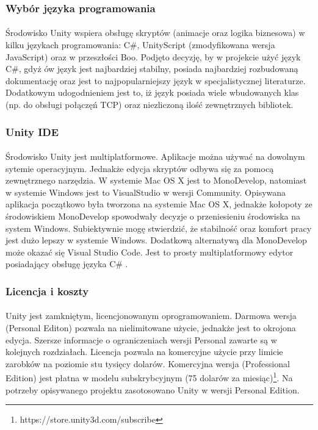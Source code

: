 \documentclass[12pt]{article}
\begin{document}
{{\subsubsection{Wybór języka programowania}
\paragraph{}
Środowisko Unity wspiera obsługę skryptów (animacje oraz logika biznesowa) w kilku językach programowania: C\#, UnityScript (zmodyfikowana wersja JavaScript)  oraz w przeszłości Boo. Podjęto decyzję, by w projekcie użyć język C\#, gdyż ów język jest najbardziej stabilny, posiada najbardziej rozbudowaną dokumentację oraz jest to najpopularniejszy język w specjalistycznej literaturze. Dodatkowym udogodnieniem  jest to, iż  język posiada wiele wbudowanych klas (np. do obsługi połączęń TCP) oraz niezliczoną ilość zewnętrznych bibliotek.
\subsubsection{Unity IDE}
\paragraph{}
Środowisko Unity jest multiplatformowe. Aplikacje można używać na dowolnym sytemie operacyjnym. Jednakże edycja skryptów odbywa się za pomocą zewnętrznego narzędzia. W systemie Mac OS X jest to MonoDevelop, natomiast w systemie Windows jest to VisualStudio w wersji Community. Opisywana aplikacja początkowo była tworzona na systemie Mac OS X, jednakże kołopoty ze środowiskiem MonoDevelop spowodwały decyzje o przeniesieniu środowiska na system Windows. Subiektywnie mogę stwierdzić, że stabilność oraz komfort pracy jest dużo lepszy w systemie Windows.
Dodatkową alternatywą dla MonoDevelop może okazać się Visual Studio Code. Jest to prosty multiplatformowy edytor posiadający obsługę języka C\# .

\subsubsection{Licencja i koszty}
\paragraph{}
Unity jest zamkniętym, licencjonowanym oprogramowaniem. Darmowa wersja (Personal Editon) pozwala na nielimitowane użycie, jednakże jest to okrojona edycja. Szersze informacje o ograniczeniach wersji Personal zawarte są w kolejnych rozdziałach. Licencja pozwala na komercyjne użycie przy limicie zarobków na poziomie stu tysięcy dolarów.
Komercyjna wersja (Professional Edition) jest płatna w modelu subskrybcyjnym (75 dolarów za miesiąc)\footnote{https://store.unity3d.com/subscribe}.
Na potrzeby opisywanego projektu zasotosowano Unity w wersji Personal Edition.

}}
\end{document}
